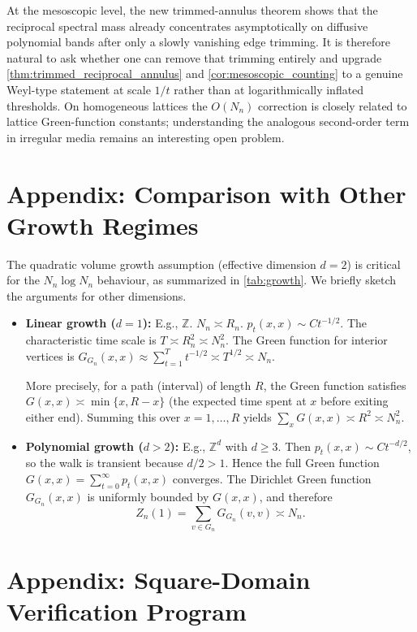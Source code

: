 \documentclass[reqno]{amsart}
\numberwithin{equation}{section}
\theoremstyle{definition}
\theoremstyle{remark}
\newcommand{\Cref}[1]{\autoref{#1}}
\begin{document}
At the mesoscopic level, the new trimmed-annulus theorem shows that the reciprocal spectral mass already concentrates asymptotically on diffusive polynomial bands after only a slowly vanishing edge trimming. It is therefore natural to ask whether one can remove that trimming entirely and upgrade \Cref{thm:trimmed_reciprocal_annulus} and \Cref{cor:mesoscopic_counting} to a genuine Weyl-type statement at scale $1/t$ rather than at logarithmically inflated thresholds. On homogeneous lattices the $O(N_n)$ correction is closely related to lattice Green-function constants; understanding the analogous second-order term in irregular media remains an interesting open problem.



\appendix

\section{Appendix: Comparison with Other Growth Regimes}\label{app:growth}
The quadratic volume growth assumption (effective dimension $d=2$) is critical for the $N_n \log N_n$ behaviour, as summarized in \Cref{tab:growth}. We briefly sketch the arguments for other dimensions.

\begin{itemize}
\item \textbf{Linear growth ($d=1$):} E.g., $\mathbb{Z}$. $N_n \asymp R_n$. $p_t(x,x) \sim C t^{-1/2}$. The characteristic time scale is $T \asymp R_n^2 \asymp N_n^2$. The Green function for interior vertices is $G_{G_n}(x,x) \approx \sum_{t=1}^{T} t^{-1/2} \asymp T^{1/2} \asymp N_n$.

More precisely, for a path (interval) of length $R$, the Green function satisfies $G(x,x) \asymp \min\{x, R-x\}$ (the expected time spent at $x$ before exiting either end). Summing this over $x=1,\dots,R$ yields $\sum_x G(x,x) \asymp R^2 \asymp N_n^2$.


\item \textbf{Polynomial growth ($d>2$):} E.g., $\mathbb{Z}^d$ with $d\geq 3$. Then $p_t(x,x) \sim C t^{-d/2}$, so the walk is transient because $d/2 > 1$. Hence the full Green function $G(x,x) = \sum_{t=0}^{\infty} p_t(x,x)$ converges. The Dirichlet Green function $G_{G_n}(x,x)$ is uniformly bounded by $G(x,x)$, and therefore
\[
Z_n(1) = \sum_{v \in G_n} G_{G_n}(v,v) \asymp N_n.
\]
\end{itemize}


\section{Appendix: Square-Domain Verification Program}
\label{app:alt_pi}
\end{document}
